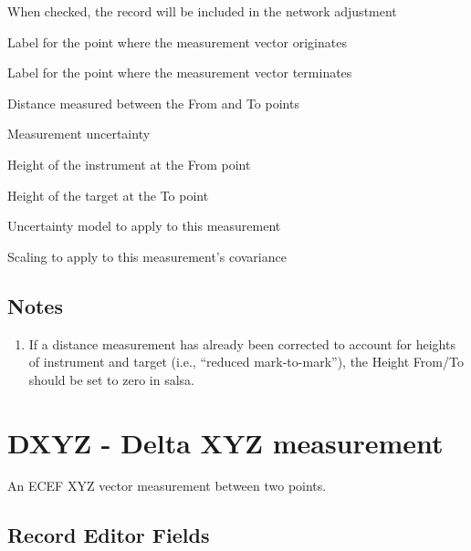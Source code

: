\begin{description}[leftmargin=!,labelwidth=\widthof{\bfseries Height From1:}]
\item[Enabled:] When checked, the record will be included in the network adjustment
\item[From:] Label for the point where the measurement vector originates
\item[To:] Label for the point where the measurement vector terminates
\item[Distance:] Distance measured between the From and To points
\item[Sigma:] Measurement uncertainty
\item[Height From\textsuperscript{1}:] Height of the instrument at the From point
\item[Height To:] Height of the target at the To point
\item[Uncertainty:] Uncertainty model to apply to this measurement
\item[Scaling:] Scaling to apply to this measurement's covariance
\end{description}

\subsection*{Notes}
\begin{enumerate}
\item If a distance measurement has already been corrected to account for heights of instrument and target (i.e., ``reduced mark-to-mark''), the Height From/To should be set to zero in \textsf{salsa}.
\end{enumerate}


\newpage
\section{DXYZ - Delta XYZ measurement}

An ECEF XYZ vector measurement between two points.

\subsection*{Record Editor Fields}

